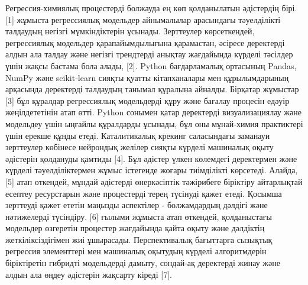 \begin{multicols}{2}
Регрессия-химиялық процестерді болжауда ең көп қолданылатын әдістердің
бірі. {[}1{]} жұмыста регрессиялық модельдер айнымалылар арасындағы
тәуелділікті талдаудың негізгі мүмкіндіктерін ұсынады. Зерттеулер
көрсеткендей, регрессиялық модельдер қарапайымдылығына қарамастан,
әсіресе деректерді алдын ала талдау және негізгі трендтерді анықтау
жағдайында күрделі тәсілдер үшін жақсы бастама бола алады, {[}2{]}.
Python бағдарламалық ортасының Pandas, NumPy және scikit-learn сияқты
қуатты кітапханалары мен құрылымдарының арқасында деректерді талдаудың
танымал құралына айналды. Бірқатар жұмыстар {[}3{]} бұл құралдар
регрессиялық модельдерді құру және бағалау процесін едәуір
жеңілдететінін атап өтті. Python сонымен қатар деректерді
визуализациялау және модельдеу үшін ыңғайлы құралдарды ұсынады, бұл оны
мұнай-химия практиктері үшін ерекше құнды етеді. Каталитикалық крекинг
саласындағы заманауи зерттеулер көбінесе нейрондық желілер сияқты
күрделі машиналық оқыту әдістерін қолдануды қамтиды {[}4{]}. Бұл әдістер
үлкен көлемдегі деректермен және күрделі тәуелділіктермен жұмыс
істегенде жоғары тиімділікті көрсетеді. Алайда, {[}5{]} атап өткендей,
мұндай әдістерді өнеркәсіптік тәжірибеге біріктіру айтарлықтай есептеу
ресурстарын және процестерді терең түсінуді қажет етеді. Қосымша
зерттеуді қажет ететін маңызды аспектілер - болжамдардың дәлдігі және
нәтижелерді түсіндіру. {[}6{]} ғылыми жұмыста атап өткендей,
қолданыстағы модельдер өзгеретін процестер жағдайында қайта оқыту және
дәлдіктің жеткіліксіздігімен жиі ұшырасады. Перспективалық бағыттарға
сызықтық регрессия элементтері мен машиналық оқытудың күрделі
алгоритмдерін біріктіретін гибридті модельдерді дамыту, сондай-ақ
деректерді жинау және алдын ала өңдеу әдістерін жақсарту кіреді {[}7{]}.


\end{multicols}
